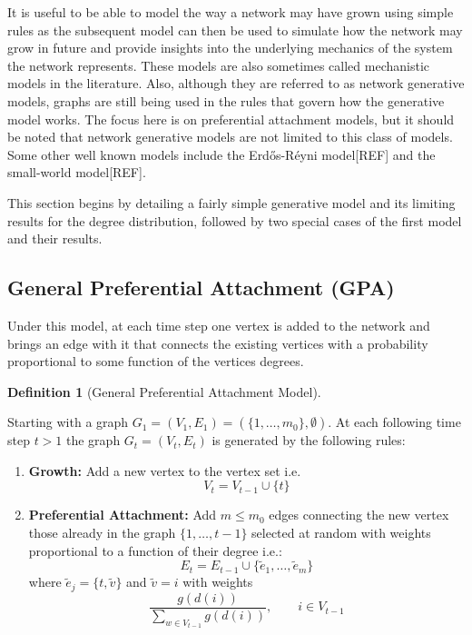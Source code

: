 \documentclass[
  10pt,
  a4paper,
]{scrreprt}
\providecommand{\tightlist}{%
  \setlength{\itemsep}{0pt}\setlength{\parskip}{0pt}}\usepackage{longtable,booktabs,array}
\theoremstyle{definition}
\newtheorem{definition}{Definition}[section]
\theoremstyle{plain}
\theoremstyle{plain}
\theoremstyle{plain}
\theoremstyle{remark}
\begin{document}
{It is useful to be able to model the way a network may have grown using
simple rules as the subsequent model can then be used to simulate how
the network may grow in future and provide insights into the underlying
mechanics of the system the network represents. These models are also
sometimes called mechanistic models in the literature. Also, although
they are referred to as network generative models, graphs are still
being used in the rules that govern how the generative model works. The
focus here is on preferential attachment models, but it should be noted
that network generative models are not limited to this class of models.
Some other well known models include the Erdős-Réyni model{[}REF{]} and
the small-world model{[}REF{]}.

This section begins by detailing a fairly simple generative model and
its limiting results for the degree distribution, followed by two
special cases of the first model and their results.

\hypertarget{general-preferential-attachment-gpa}{%
\subsection{General Preferential Attachment
(GPA)}\label{general-preferential-attachment-gpa}}

Under this model, at each time step one vertex is added to the network
and brings an edge with it that connects the existing vertices with a
probability proportional to some function of the vertices degrees.

\begin{definition}[General Preferential Attachment
Model]\protect\hypertarget{def-gpa}{}\label{def-gpa}

Starting with a graph
\(G_1 = (V_1, E_1) = (\{1,\ldots,m_0\}, \emptyset)\). At each following
time step \(t>1\) the graph \(G_t = (V_t, E_t)\) is generated by the
following rules:

\begin{enumerate}
\def\labelenumi{\arabic{enumi}.}
\tightlist
\item
  \textbf{Growth:} Add a new vertex to the vertex set i.e.~\[
  V_t = V_{t-1} \cup \{t\}
  \]
\item
  \textbf{Preferential Attachment:} Add \(m\le m_0\) edges connecting
  the new vertex those already in the graph \(\{1,\ldots,t-1\}\)
  selected at random with weights proportional to a function of their
  degree i.e.: \[
  E_t  = E_{t-1} \cup \{\tilde e_1,\ldots,\tilde e_m\}
  \] where \(\tilde e_j = \{t,\tilde v\}\) and \(\tilde v = i\) with
  weights \[
  \displaystyle\frac{g(d(i))}{\sum_{w\in V_{t-1}} g(d(i))}, \qquad i\in V_{t-1}
  \]
\end{enumerate}


\end{definition}}
\end{document}
